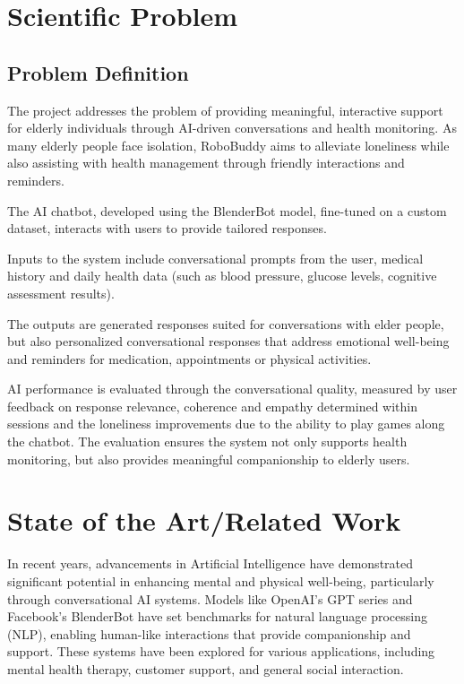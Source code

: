 \documentclass[runningheads,a4paper,11pt]{report}
\begin{document}
\chapter{Scientific Problem}
\label{section:scientificProblem}

\section{Problem Definition}
\label{section:problemDefinition}

The project addresses the problem of providing meaningful, interactive support for elderly individuals through AI-driven conversations and health monitoring. As many elderly people face isolation, RoboBuddy aims to alleviate loneliness while also assisting with health management through friendly interactions and reminders.

The AI chatbot, developed using the BlenderBot model, fine-tuned on a custom dataset, interacts with users to provide tailored responses. 

Inputs to the system include conversational prompts from the user, medical history and daily health data (such as blood pressure, glucose levels, cognitive assessment results). 

The outputs are generated responses suited for conversations with elder people, but also personalized conversational responses that address emotional well-being and reminders for medication, appointments or physical activities.

AI performance is evaluated through the conversational quality, measured by user feedback on response relevance, coherence and empathy determined within sessions and the loneliness improvements due to the ability to play games along the chatbot. The evaluation ensures the system not only supports health monitoring, but also provides meaningful companionship to elderly users.

\chapter{State of the Art/Related Work}
\label{chapter:stateOfArt}

In recent years, advancements in Artificial Intelligence have demonstrated significant potential in enhancing mental and physical well-being, particularly through conversational AI systems. Models like OpenAI's GPT series and Facebook's BlenderBot have set benchmarks for natural language processing (NLP), enabling human-like interactions that provide companionship and support. These systems have been explored for various applications, including mental health therapy, customer support, and general social interaction.
\end{document}
